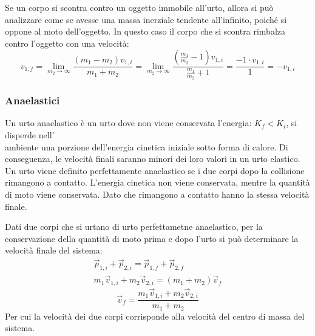 \documentclass{article}
\numberwithin{equation}{subsection}
\begin{document}
Se un corpo si scontra contro un oggetto immobile all'urto, 
allora si può analizzare come se avesse una massa inerziale 
tendente all'infinito, poiché si oppone al moto dell'oggetto. 
In questo caso il corpo che si scontra rimbalza contro l'oggetto 
con una velocità: 
\begin{equation}
    v_{1,f}=\displaystyle\lim_{m_2\to\infty}\frac{(m_1-m_2)v_{1,i}}{m_1+m_2}=\lim_{m_2\to\infty}\frac{\left(\frac{m_1}{m_2}-1\right)v_{1,i}}{\frac{m_1}{m_2}+1}=\frac{-1\cdot v_{1,i}}{1}=-v_{1,i}
\end{equation}

\subsubsection{Anaelastici}


Un urto anaelastico è un urto dove non viene conservata 
l'energia: $K_f<K_i$, si disperde nell'\\ambiente una porzione 
dell'energia cinetica iniziale sotto forma di calore. Di conseguenza, le velocità 
finali saranno minori dei loro valori in un urto elastico. 
\\
Un urto viene definito perfettamente anaelastico se i due corpi dopo la collisione rimangono a contatto. L'energia cinetica non viene conservata, 
mentre la quantità di moto viene conservata. Dato che rimangono a contatto hanno la stessa velocità finale. 


Dati due corpi che si urtano di urto perfettametne anaelastico, per la conservazione della quantità di moto prima e dopo l'urto si può determinare la velocità finale del sistema: 
\begin{gather*}
    \vec{p}_{1,i}+\vec{p}_{2,i}=\vec{p}_{1,f}+\vec{p}_{2,f}\\
    m_1\vec{v}_{1,i}+m_2\vec{v}_{2,i}=(m_1+m_2)\vec{v}_f
\end{gather*}
\begin{equation}
    \vec{v}_f=\displaystyle\frac{m_1\vec{v}_{1,i}+m_2\vec{v}_{2,i}}{m_1+m_2}
\end{equation}
Per cui la velocità dei due corpi corrisponde 
alla velocità del centro di massa del sistema. 
\end{document}
